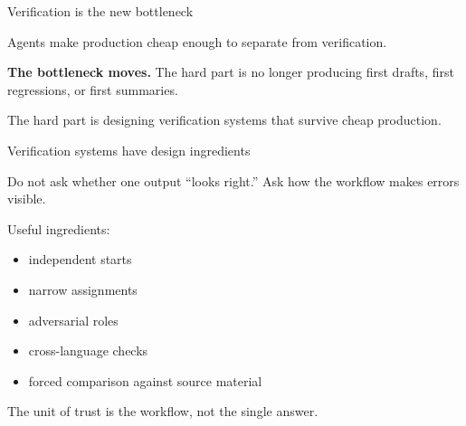 \documentclass[aspectratio=169,11pt]{beamer}
\begin{document}
\begin{frame}{Verification is the new bottleneck}

Agents make production cheap enough to separate from verification.

\vspace{0.4cm}

\begin{center}
\end{center}

\vspace{0.45cm}

\textbf{The bottleneck moves.} The hard part is no longer producing first drafts, first regressions, or first summaries.

\vspace{0.25cm}

\alert{The hard part is designing verification systems that survive cheap production.}

\end{frame}

\begin{frame}{Verification systems have design ingredients}

Do not ask whether one output ``looks right.'' Ask how the workflow makes errors visible.

\vspace{0.25cm}

Useful ingredients:

\begin{itemize}\setlength\itemsep{0.3em}
    \item independent starts
    \item narrow assignments
    \item adversarial roles
    \item cross-language checks
    \item forced comparison against source material
\end{itemize}

\vspace{0.1cm}
\alert{The unit of trust is the workflow, not the single answer.}

\end{frame}
\end{document}
